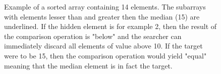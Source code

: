 
\begin{figure}[ht]
\centering
{}
\caption[Binary search]{Example of a sorted array containing 14 elements. The subarrays with elements lesser than and greater then the median (15) are underlined. If the hidden element is for example 2, then the result of the comparison operation is "below" and the searcher can immediately discard all elements of value above 10. If the target were to be 15, then the comparison operation would yield "equal" meaning that the median element is in fact the target.}
\label{fig:binary-search-subarrays}
\end{figure}
